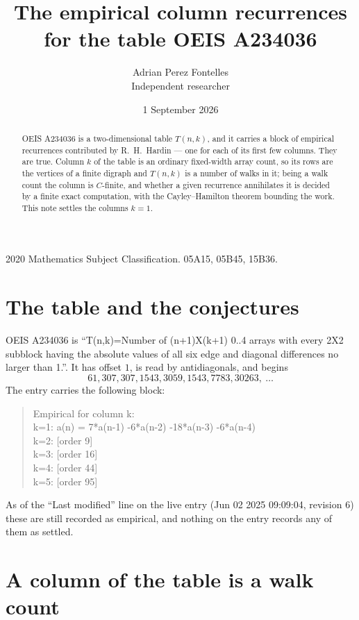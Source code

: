 \documentclass[11pt,a4paper]{article}
\title{The empirical column recurrences for the table OEIS A234036}
\author{Adrian Perez Fontelles\\ \small Independent researcher}
\date{1 September 2026}
\theoremstyle{plain}
\theoremstyle{definition}
\begin{document}
\maketitle

\begin{abstract}
OEIS A234036 is a two-dimensional table $T(n,k)$, and it carries a block of empirical
recurrences contributed by R.~H.~Hardin --- one for each of its first few columns. They are
true. Column $k$ of the table is an ordinary fixed-width array count, so its rows are the
vertices of a finite digraph and $T(n,k)$ is a number of walks in it; being a walk count the
column is $C$-finite, and whether a given recurrence annihilates it is decided by a finite
exact computation, with the Cayley--Hamilton theorem bounding the work. This note settles the columns $k=1$.
\end{abstract}

\noindent\small 2020 Mathematics Subject Classification. 05A15, 05B45, 15B36.\normalsize

\section{The table and the conjectures}

OEIS A234036 is ``T(n,k)=Number of (n+1)X(k+1) 0..4 arrays with every 2X2 subblock having the absolute values of all six edge and diagonal differences no larger than 1.''. It has offset $1$, is
read by antidiagonals, and begins
\[
61, 307, 307, 1543, 3059, 1543, 7783, 30263,\ \dots
\]
The entry carries the following block:
\begin{quote}\small
Empirical for column k:\\
k=1: a(n) = 7*a(n-1) -6*a(n-2) -18*a(n-3) -6*a(n-4)\\
k=2: [order 9]\\
k=3: [order 16]\\
k=4: [order 44]\\
k=5: [order 95]\\
\end{quote}
As of the ``Last modified'' line on the live entry (Jun 02 2025 09:09:04, revision 6) these are still
recorded as empirical, and nothing on the entry records any of them as settled.

\section{A column of the table is a walk count}
\end{document}
